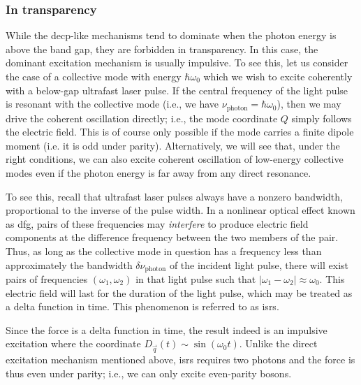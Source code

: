 \subsubsection{In transparency}\label{sec:intransparency}

While the \gls{decp}-like mechanisms tend to dominate when the photon energy is above the band gap, they are forbidden in transparency.
In this case, the dominant excitation mechanism is usually impulsive.
To see this, let us consider the case of a collective mode with energy $\hbar\omega_0$ which we wish to excite coherently with a below-gap ultrafast laser pulse.
If the central frequency of the light pulse is resonant with the collective mode (i.e., we have $\nu_\mathrm{photon}=\hbar\omega_0$), then we may drive the coherent oscillation directly; i.e., the mode coordinate $Q$ simply follows the electric field.
This is of course only possible if the mode carries a finite dipole moment (i.e. it is odd under parity).
Alternatively, we will see that, under the right conditions, we can also excite coherent oscillation of low-energy collective modes even if the photon energy is far away from any direct resonance.

To see this, recall that ultrafast laser pulses always have a nonzero bandwidth, proportional to the inverse of the pulse width.
In a nonlinear optical effect known as \gls{dfg}, pairs of these frequencies may \emph{interfere} to produce electric field components at the difference frequency between the two members of the pair.
Thus, as long as the collective mode in question has a frequency less than approximately the bandwidth $\delta \nu_\mathrm{photon}$ of the incident light pulse, there will exist pairs of frequencies $(\omega_1,\omega_2)$ in that light pulse such that $|\omega_1-\omega_2|\approx\omega_0$.
This electric field will last for the duration of the light pulse, which may be treated as a delta function in time.
This phenomenon is referred to as \gls{isrs}.

Since the force is a delta function in time, the result indeed is an impulsive excitation where the coordinate $D_{\vec{q}}(t)\sim\sin(\omega_0t)$.
Unlike the direct excitation mechanism mentioned above, \gls{isrs} requires two photons and the force is thus even under parity; i.e., we can only excite even-parity bosons.

